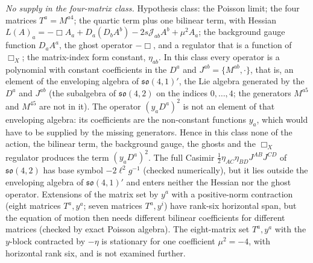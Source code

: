 \emph{No supply in the four-matrix class.} Hypothesis class: the Poisson limit; the four matrices \(T^a=M^{a4}\); the quartic term plus one bilinear term, with Hessian \(L(A)_a=-\Box A_a+D_a(D_bA^b)-2s\mathcal J_{ab}A^b+\mu^2A_a\); the background gauge function \(D_aA^a\), the ghost operator \(-\Box\), and a regulator that is a function of \(\Box_X\); the matrix-index form constant, \(\eta_{ab}\). In this class every operator is a polynomial with constant coefficients in the \(D^a\) and \(J^{ab}=\{M^{ab},\cdot\}\), that is, an element of the enveloping algebra of \(\mathfrak{so}(4,1)'\), the Lie algebra generated by the \(D^a\) and \(J^{ab}\) (the subalgebra of \(\mathfrak{so}(4,2)\) on the indices \(0,\dots,4\); the generators \(M^{a5}\) and \(M^{45}\) are not in it). The operator \((y_aD^a)^2\) is not an element of that enveloping algebra: its coefficients are the non-constant functions \(y_a\), which would have to be supplied by the missing generators. Hence in this class none of the action, the bilinear term, the background gauge, the ghosts and the \(\Box_X\) regulator produces the term \((y_aD^a)^2\). The full Casimir \(\tfrac12\eta_{AC}\eta_{BD}J^{AB}J^{CD}\) of \(\mathfrak{so}(4,2)\) has base symbol \(-2\ell^2g^{-1}\) (checked numerically), but it lies outside the enveloping algebra of \(\mathfrak{so}(4,1)'\) and enters neither the Hessian nor the ghost operator. Extensions of the matrix set by \(y^a\) with a positive-norm contraction (eight matrices \(T^a,y^a\); seven matrices \(T^a,y^i\)) have rank-six horizontal span, but the equation of motion then needs different bilinear coefficients for different matrices (checked by exact Poisson algebra). The eight-matrix set \(T^a,y^a\) with the \(y\)-block contracted by \(-\eta\) is stationary for one coefficient \(\mu^2=-4\), with horizontal rank six, and is not examined further.



